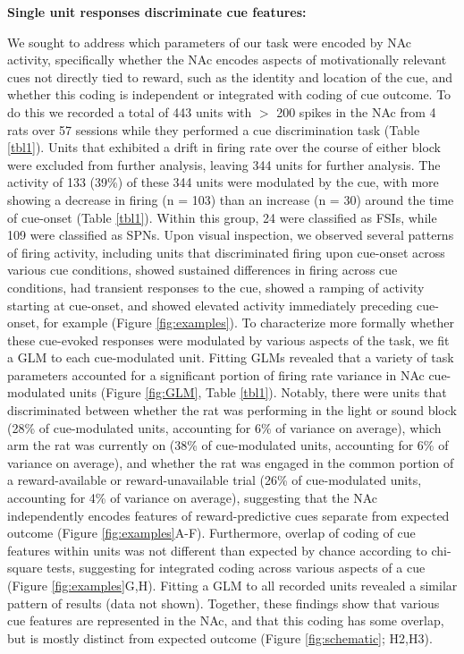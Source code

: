 \documentclass[11pt]{article}
\begin{document}
{{\bf Single unit responses discriminate cue features:}

We sought to address which parameters of our task were encoded by NAc activity,
specifically whether the NAc encodes aspects of motivationally relevant cues not
directly tied to reward, such as the identity and location of the cue, and
whether this coding is independent or integrated with coding of cue outcome. To
do this we recorded a total of 443 units with $>$ 200 spikes in the NAc from 4
rats over 57 sessions while they performed a cue discrimination task (Table
\ref{tbl1}). Units that exhibited a drift in firing rate over the course of
either block were excluded from further analysis, leaving 344 units for further
analysis. The activity of 133 (39\%) of these 344 units were modulated by the
cue, with more showing a decrease in firing (n = 103) than an increase (n = 30)
around the time of cue-onset (Table \ref{tbl1}). Within this group, 24 were
classified as FSIs, while 109 were classified as SPNs. Upon visual inspection,
we observed several patterns of firing activity, including units that
discriminated firing upon cue-onset across various cue conditions, showed
sustained differences in firing across cue conditions, had transient responses
to the cue, showed a ramping of activity starting at cue-onset, and showed
elevated activity immediately preceding cue-onset, for example (Figure
\ref{fig:examples}). To characterize more formally whether these cue-evoked
responses were modulated by various aspects of the task, we fit a GLM to each
cue-modulated unit. Fitting GLMs revealed that a variety of task parameters
accounted for a significant portion of firing rate variance in NAc cue-modulated
units (Figure \ref{fig:GLM}, Table \ref{tbl1}). Notably, there were units that
discriminated between whether the rat was performing in the light or sound block
(28\% of cue-modulated units, accounting for 6\% of variance on average), which
arm the rat was currently on (38\% of cue-modulated units, accounting for 6\% of
variance on average), and whether the rat was engaged in the common portion of a
reward-available or reward-unavailable trial (26\% of cue-modulated units,
accounting for 4\% of variance on average), suggesting that the NAc
independently encodes features of reward-predictive cues separate from expected
outcome (Figure \ref{fig:examples}A-F). Furthermore, overlap of coding of cue
features within units was not different than expected by chance according to
chi-square tests, suggesting for integrated coding across various aspects of a
cue (Figure \ref{fig:examples}G,H). Fitting a GLM to all recorded units revealed
a similar pattern of results (data not shown). Together, these findings show
that various cue features are represented in the NAc, and that this coding has
some overlap, but is mostly distinct from expected outcome (Figure
\ref{fig:schematic}; H2,H3).

}
\end{document}
